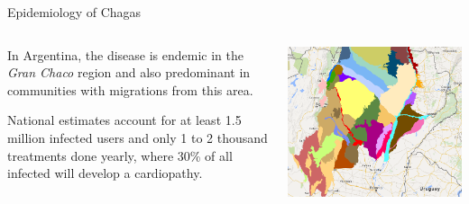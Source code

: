 \documentclass{beamer}
\begin{document}
\begin{frame}{Epidemiology of Chagas}
	\begin{columns}		
		\begin{column}{0.45\textwidth}
			
			In Argentina, the disease is endemic in the \textit{Gran Chaco} region and
			also predominant in communities with migrations from this area.
			
			\medskip National estimates account for at least 1.5 million infected users and only 1 to 2 thousand
			treatments done yearly, where 30\% of all infected will develop a cardiopathy.
			
		\end{column}
		\begin{column}{0.45\textwidth}
			\includegraphics[height=.7\textheight]{slides/Ambientes_GranChaco_TNC-Argentina.png}
		\end{column}
	\end{columns}
\end{frame}
\end{document}
